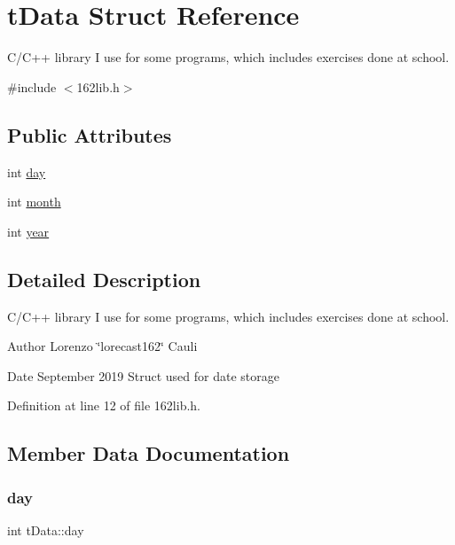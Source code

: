 \hypertarget{structtData}{}\section{t\+Data Struct Reference}
\label{structtData}


C/\+C++ library I use for some programs, which includes exercises done at school.  




{\ttfamily \#include $<$162lib.\+h$>$}

\subsection*{Public Attributes}
\begin{DoxyCompactItemize}
\item 
int \hyperlink{structtData_a71d1e2d3a39ed332ae5fbe49047e92fb}{day}
\item 
int \hyperlink{structtData_a09255da5529c4457e9bac181f6ebabac}{month}
\item 
int \hyperlink{structtData_abc54df4b847929f10f39352918fe0e0f}{year}
\end{DoxyCompactItemize}


\subsection{Detailed Description}
C/\+C++ library I use for some programs, which includes exercises done at school. 

\begin{DoxyAuthor}{Author}
Lorenzo \char`\"{}lorecast162\char`\"{} Cauli 
\end{DoxyAuthor}
\begin{DoxyDate}{Date}
September 2019 Struct used for date storage 
\end{DoxyDate}


Definition at line 12 of file 162lib.\+h.



\subsection{Member Data Documentation}
\mbox{\label{structtData_a71d1e2d3a39ed332ae5fbe49047e92fb}} 
\subsubsection{\texorpdfstring{day}{day}}
{\footnotesize\ttfamily int t\+Data\+::day}


